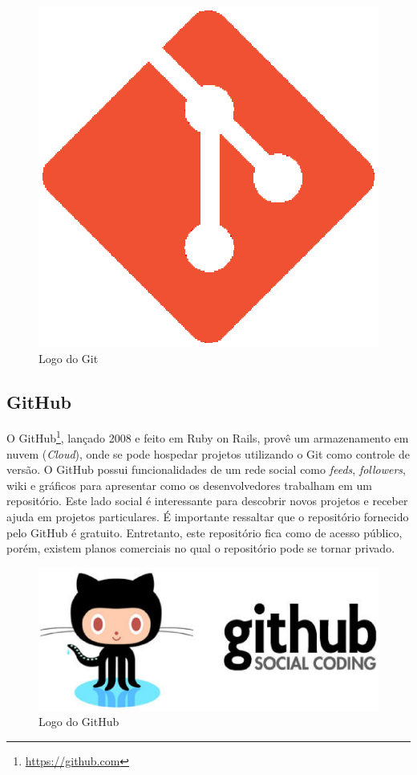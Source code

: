 \begin{figure}[!h]
	\centering
	\includegraphics[scale=0.35]{figuras/capitulo3/git.eps}
	\caption{Logo do Git}
	\label{git}
\end{figure}

\subsection{GitHub}

O GitHub\footnote{\url{https://github.com}}, lançado 2008 e feito em Ruby on Rails, provê um armazenamento em nuvem (\textit{Cloud}), onde se pode hospedar projetos utilizando o Git como controle de versão. O GitHub possui funcionalidades de um rede social como \textit{feeds}, \textit{followers}, wiki e gráficos para apresentar como os desenvolvedores trabalham em um repositório. Este lado social é interessante para descobrir novos projetos e receber ajuda em projetos particulares. É importante ressaltar que o repositório fornecido pelo GitHub é gratuito. Entretanto, este repositório fica como de acesso público, porém, existem planos comerciais no qual o repositório pode se tornar privado.

\begin{figure}[!h]
	\centering
	\includegraphics[scale=0.35]{figuras/capitulo3/logo_github.eps}
	\caption{Logo do GitHub}
	\label{logo_github}
\end{figure}

